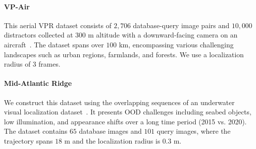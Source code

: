 \documentclass[letterpaper, 10 pt, conference]{ieeeconf}  \fi
\begin{document}
\paragraph{VP-Air} This aerial VPR dataset consists of $2,706$ database-query image pairs and $10,000$ distractors collected at $300$ m altitude with a downward-facing camera on an aircraft~\cite{schleiss2022vpair}. The dataset spans over $100$ km, encompassing various challenging landscapes such as urban regions, farmlands, and forests. We use a localization radius of $3$ frames.

\paragraph{Mid-Atlantic Ridge} We construct this dataset using the overlapping sequences of an underwater visual localization dataset~\cite{boittiaux2022eiffel}. It presents OOD challenges including seabed objects, low illumination, and appearance shifts over a long time period (2015 vs. 2020). The dataset contains $65$ database images and $101$ query images, where the trajectory spans $18$ m and the localization radius is $0.3$ m. 


 



 
\fi




\end{document}
